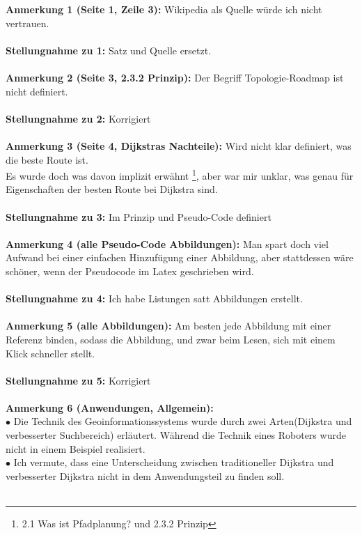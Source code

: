 \documentclass[a4paper,12pt]{book}
\begin{document}
\textbf{Anmerkung 1 (Seite 1, Zeile 3):}
Wikipedia als Quelle würde ich nicht vertrauen.
\\ \\
\textbf{Stellungnahme zu 1:}
Satz und Quelle ersetzt.
\\ \\
\textbf{Anmerkung 2 (Seite 3, 2.3.2 Prinzip): }
Der Begriff Topologie-Roadmap ist nicht definiert.
\\ \\  
\textbf{Stellungnahme zu 2:} Korrigiert
\\ \\ 
\textbf{Anmerkung 3 (Seite 4, Dijkstras Nachteile):}
Wird nicht klar definiert, was die beste Route ist.
\\
Es wurde doch was davon implizit erwähnt \footnote{ 2.1  Was ist Pfadplanung? und 2.3.2 Prinzip}, aber war mir unklar, was genau für Eigenschaften der besten Route bei Dijkstra sind.
\\ \\ 
\textbf{Stellungnahme zu 3:} Im Prinzip und Pseudo-Code definiert
\\ \\
\textbf{Anmerkung 4 (alle Pseudo-Code Abbildungen):}
Man spart doch viel Aufwand bei einer einfachen Hinzufügung einer Abbildung, aber stattdessen wäre schöner, wenn der Pseudocode im Latex geschrieben wird. 
\\ \\
\textbf{Stellungnahme zu 4:} Ich habe Listungen satt Abbildungen erstellt.
\\ \\
\textbf{Anmerkung 5 (alle Abbildungen):}
Am besten jede Abbildung mit einer Referenz binden, sodass die Abbildung, und zwar beim Lesen, sich mit einem Klick schneller stellt.
\\ \\  
\textbf{Stellungnahme zu 5:} Korrigiert
\\ \\
\textbf{Anmerkung 6 (Anwendungen, Allgemein):}
\\
$\bullet$ Die Technik des Geoinformationssystems wurde durch zwei Arten(Dijkstra und verbesserter Suchbereich) erläutert. Während die Technik eines Roboters wurde nicht in einem Beispiel realisiert.
\\
$\bullet$ Ich vermute, dass eine Unterscheidung zwischen traditioneller Dijkstra und verbesserter Dijkstra nicht in dem Anwendungsteil zu finden soll. 
\\ \\
\end{document}
